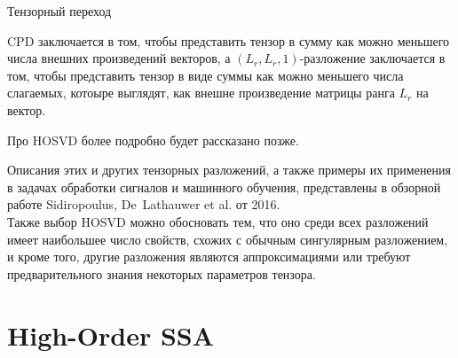 \documentclass[ucs, notheorems, handout]{beamer}
\begin{document}
\begin{frame}{Тензорный переход}
{            CPD заключается в том, чтобы представить тензор в сумму как можно меньшего числа внешних произведений векторов, а $(L_r, L_r, 1)$-разложение заключается в том, чтобы представить тензор в виде суммы как можно меньшего числа слагаемых, котоыре выглядят, как внешне произведение матрицы ранга $L_r$ на вектор.
            
            Про HOSVD более подробно будет рассказано позже.
            
            Описания этих и других тензорных разложений, а также примеры их применения в задачах обработки сигналов и машинного обучения, представлены в обзорной работе Sidiropoulus, De~Lathauwer et al. от 2016.\\
            Также выбор HOSVD можно обосновать тем, что оно среди всех разложений имеет наибольшее число свойств,
            схожих с обычным сингулярным разложением, и кроме того, другие разложения являются аппроксимациями или
            требуют предварительного знания некоторых параметров тензора.
        }
    \end{frame}


    \section{High-Order SSA}\label{sec:known}
    
\end{document}
